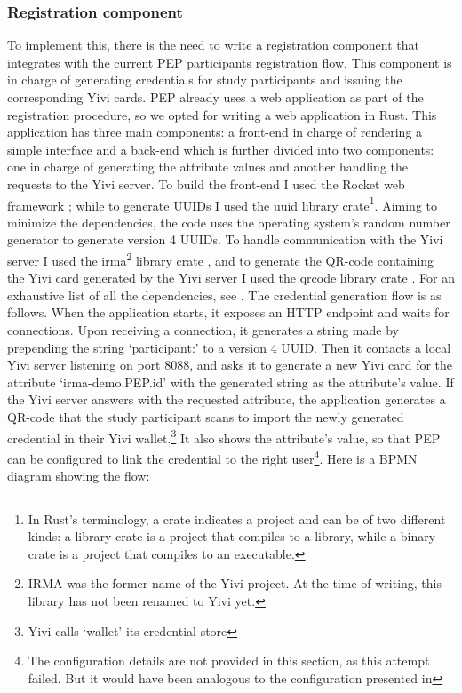 \documentclass{report}
\begin{document}
\subsubsection{Registration component}\label{registration-component}
To implement this, there is the need to write a registration component that integrates with the current PEP participants registration flow. This component is in charge of
generating credentials for study participants and issuing the corresponding Yivi cards. PEP already uses a web application as part of the registration procedure, so we opted for
writing a web application in Rust. This application has three main components: a front-end in charge of rendering a simple interface and a back-end which is further divided into
two components: one in charge of generating the attribute values and another handling the requests to the Yivi server. To build the front-end I used the Rocket web framework
\cite{rocket}; while to generate UUIDs I used the uuid \cite{uuid_crate} library crate\footnote{In Rust's terminology, a crate indicates a project and can be of two different kinds:
a library crate is a project that compiles to a library, while a binary crate is a project that compiles to an executable.}. Aiming to minimize the dependencies, the code uses the
operating system's random number generator to generate version 4 UUIDs. To handle communication with the Yivi server I used the irma\footnote{IRMA was the former name of the Yivi
project. At the time of writing, this library has not been renamed to Yivi yet.} library crate \cite{irma_crate}, and to generate the QR-code containing the Yivi card generated by
the Yivi server I used the qrcode library crate \cite{qrcode_crate}. For an exhaustive list of all the dependencies, see \cite{registration_poc_cargo_toml}. The credential
generation flow is as follows. When the application starts, it exposes an HTTP endpoint and waits for connections. Upon receiving a connection, it generates a string made by
prepending the string \enquote*{participant:} to a version 4 UUID. Then it contacts a local Yivi server listening on port 8088, and asks it to generate a new Yivi card for the
attribute \enquote*{irma-demo.PEP.id} with the generated string as the attribute's value. If the Yivi server answers with the requested attribute, the application generates a
QR-code that the study participant scans to import the newly generated credential in their Yivi wallet.\footnote{Yivi calls \enquote*{wallet} its credential store} It also shows the attribute's value, so that PEP can
be configured to link the credential to the right user\footnote{The configuration details are not provided in this section, as this attempt failed. But it would have been analogous
to the configuration presented in}. Here is a BPMN diagram showing the flow:
\end{document}
